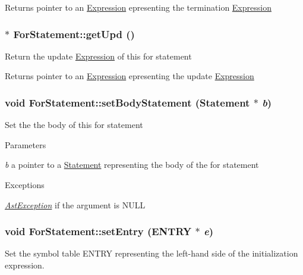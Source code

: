 \begin{DoxyReturn}{Returns}
pointer to an \hyperlink{classExpression}{Expression} epresenting the termination \hyperlink{classExpression}{Expression} 
\end{DoxyReturn}
\hypertarget{classForStatement_a81f61002e628cff42005f4dce5c477f2}{
\subsubsection[{getUpd}]{$\ast$ ForStatement::getUpd ()}}
\label{classForStatement_a81f61002e628cff42005f4dce5c477f2}
Return the update \hyperlink{classExpression}{Expression} of this for statement

\begin{DoxyReturn}{Returns}
pointer to an \hyperlink{classExpression}{Expression} epresenting the update \hyperlink{classExpression}{Expression} 
\end{DoxyReturn}
\hypertarget{classForStatement_af81e95d20aa9fe2e84cf1611845653bb}{
\subsubsection[{setBodyStatement}]{\setlength{\rightskip}{0pt plus 5cm}void ForStatement::setBodyStatement ({\bf Statement} $\ast$ {\em b})}}
\label{classForStatement_af81e95d20aa9fe2e84cf1611845653bb}
Set the the body of this for statement


\begin{DoxyParams}{Parameters}
\item[{\em b}]a pointer to a \hyperlink{classStatement}{Statement} representing the body of the for statement \end{DoxyParams}

\begin{DoxyExceptions}{Exceptions}
\item[{\em \hyperlink{classAstException}{AstException}}]if the argument is NULL \end{DoxyExceptions}
\hypertarget{classForStatement_a1634064d332150b7a62ac40813776f84}{
\subsubsection[{setEntry}]{\setlength{\rightskip}{0pt plus 5cm}void ForStatement::setEntry (ENTRY $\ast$ {\em e})}}
\label{classForStatement_a1634064d332150b7a62ac40813776f84}
Set the symbol table ENTRY representing the left-\/hand side of the initialization expression.


